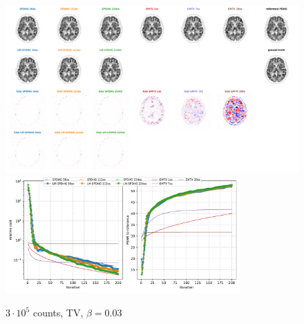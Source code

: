 \begin{figure}
  \centering
    \includegraphics[width=1.0\textwidth]{./figs/brain2d_counts_3.0E+05_seed_1_beta_3.0E-02_prior_TV_niter_ref_20000_fwhm_4.5_4.5_niter_200.png}
    \includegraphics[width=0.8\textwidth]{./figs/brain2d_counts_3.0E+05_seed_1_beta_3.0E-02_prior_TV_niter_ref_20000_fwhm_4.5_4.5_niter_200_metrics.pdf}
  \caption{$3\cdot10^5$ counts, TV, $\beta = 0.03$}
\end{figure}

